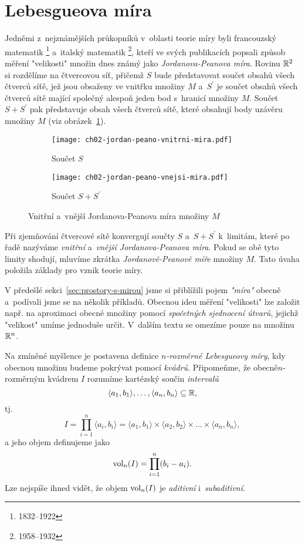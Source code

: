 \section{Lebesgueova míra}\label{sec:lebesgueova-mira}

Jedněmi z~nejznámějších průkopníků v~oblasti teorie míry byli francouzský matematik \footnote{1832--1922} a~italský matematik \footnote{1958--1932}, kteří ve svých publikacích popsali způsob měření "velikosti" množin dnes známý jako \emph{Jordanova-Peanova míra}. Rovinu $\mathbb{R}^2$ si rozdělíme na čtvercovou síť, přičemž $S$ bude představovat součet obsahů všech čtverců síťě, jež jsou obsaženy ve vnitřku množiny $M$ a~$S^\prime$ je součet obsahů všech čtverců sítě mající společný alespoň jeden bod s~hranicí množiny $M$. Součet $S+S^\prime$ pak představuje obsah všech čtverců sítě, které obsahují body uzávěru množiny $M$ (viz obrázek~\ref{fig:jordan-peano-mira}).
\begin{figure}[h]
    \centering
    \begin{subfigure}{0.4\textwidth}
        \centering
        \texttt{[image: ch02-jordan-peano-vnitrni-mira.pdf]}
        \caption{Součet $S$}
    \end{subfigure}
    \qquad
    \begin{subfigure}{0.4\textwidth}
        \centering
        \texttt{[image: ch02-jordan-peano-vnejsi-mira.pdf]}
        \caption{Součet $S+S^\prime$}
    \end{subfigure}
    \caption{Vnitřní a~vnější Jordanova-Peanova míra množiny $M$}
    \label{fig:jordan-peano-mira}
\end{figure}
Při zjemňování čtvercové sítě konvergují součty $S$ a~$S+S^\prime$ k~limitám, které po řadě nazýváme \emph{vnitřní} a~\emph{vnější Jordanova-Peanova míra}. Pokud se obě tyto limity shodují, mluvíme zkrátka \emph{Jordanově-Peanově míře} množiny $M$. Tato úvaha položila základy pro vznik teorie míry. \cite{Sarmanova1996}

V předešlé sekci~\ref{sec:prostory-s-mirou} jsme si přiblížili pojem \emph{"míra"} obecně a~podívali jsme se na několik příkladů. Obecnou ideu měření "velikosti" lze založit např. na aproximaci obecné množiny pomocí \emph{spočetných sjednocení útvarů}, jejichž "velikost" umíme jednoduše určit. V~dalším textu se omezíme pouze na množinu $\mathbb{R}^n$.

Na zmíněné myšlence je postavena definice \emph{$n$-rozměrné Lebesgueovy míry}, kdy obecnou množinu budeme pokrývat pomocí \emph{kvádrů}. Připomeňme, že obecně\linebreak\mbox{$n$-rozměrným} kvádrem $I$ rozumíme kartézský součin \emph{intervalů}
\[\langle a_1,b_1\rangle,\ldots,\langle a_n,b_n\rangle\subseteq\mathbb{R},\]
tj.
\[I=\prod_{i=1}^{n}\langle a_i,b_i\rangle=\langle a_1,b_1\rangle\times\langle a_2,b_2\rangle\times\dots\times\langle a_n,b_n\rangle,\]
a jeho objem definujeme jako
\[\operatorname{vol}_n(I)=\prod_{i=1}^{n}(b_i-a_i).\]
Lze nejspíše ihned vidět, že objem $\operatorname{vol}_n(I)$ je \emph{aditivní} i~\textit{subaditivní}.

